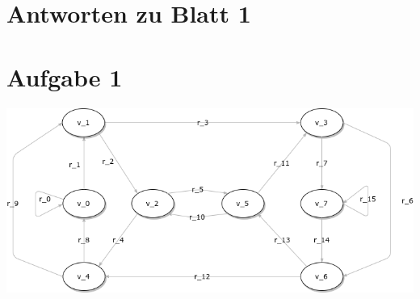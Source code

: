 \documentclass{scrartcl}
\begin{document}
\section*{Antworten zu Blatt 1}


\section*{Aufgabe 1}
\includegraphics[width=14cm]{brown_graph.png}
\newline
\end{document}
